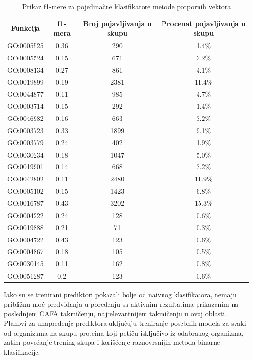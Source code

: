\begin{table}[h]
	\centering
	\begin{tabular}{|c|c|c|c|}
		\hline
		Funkcija & f1-mera & Broj pojavljivanja u skupu & Procenat pojavljivanja u skupu \\		\hline
		GO:0005525 & 0.36 & 290 & 1.4\% \\
		\hline
		GO:0005524 & 0.15 & 671 & 3.2\% \\
		\hline
		GO:0008134 & 0.27 & 861 & 4.1\% \\
		\hline
		GO:0019899 & 0.19 & 2381 & 11.4\% \\
		\hline
		GO:0044877 & 0.11 & 985 & 4.7\% \\
		\hline
		GO:0003714 & 0.15 & 292 & 1.4\% \\
		\hline
		GO:0046982 & 0.16 & 663 & 3.2\% \\
		\hline
		GO:0003723 & 0.33 & 1899 & 9.1\% \\
		\hline
		GO:0003779 & 0.24 & 402 & 1.9\% \\
		\hline
		GO:0030234 & 0.18 & 1047 & 5.0\% \\
		\hline
		GO:0019901 & 0.14 & 668 & 3.2\% \\
		\hline
		GO:0042802 & 0.11 & 2480 & 11.9\% \\
		\hline
		GO:0005102 & 0.15 & 1423 & 6.8\% \\
		\hline
		GO:0016787 & 0.43 & 3202 & 15.3\% \\
		\hline
		GO:0004222 & 0.24 & 128 & 0.6\% \\
		\hline
		GO:0019888 & 0.21 & 71 & 0.3\% \\
		\hline
		GO:0004722 & 0.43 & 123 & 0.6\% \\
		\hline
		GO:0004867 & 0.18 & 105 & 0.5\% \\
		\hline
		GO:0030145 & 0.11 & 162 & 0.8\% \\
		\hline
		GO:0051287 & 0.2 & 123 & 0.6\% \\
		\hline
	\end{tabular}
	\caption{Prikaz f1-mere za pojedina\v cne klasifikatore metode potpornih vektora}
	\label{tab: svmF1}
\end{table}


Iako su se trenirani prediktori pokazali bolje od naivnog klasifikatora, nemaju približnu moć predviđanja u poređenju sa aktivnim rezultatima prikazanim na poslednjem CAFA takmičenju, najrelevantnijem takmičenju u ovoj oblasti. Planovi za unapređenje prediktora uključuju treniranje posebnih modela za svaki od organizama na skupu proteina koji potiču isključivo iz odabranog organizma, zatim povećanje trening skupa i korišćenje raznovrsnijih  metoda binarne klasifikacije.

